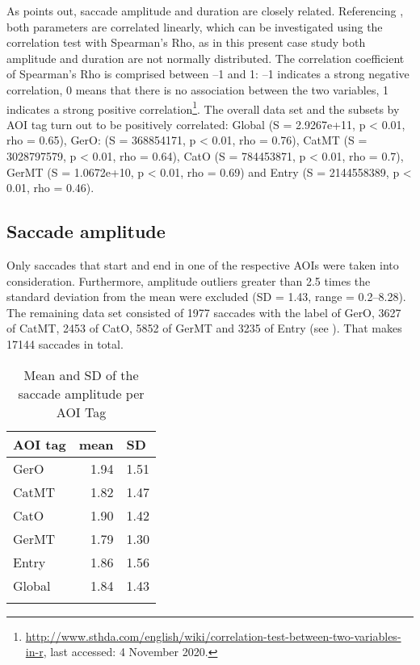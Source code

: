 \documentclass[output=paper,colorlinks,citecolor=brown]{langscibook}
\begin{document}
As \citet[321]{holmqvist_eye_2011} points out, saccade amplitude and duration are closely related. Referencing \citet{carpenter_movements_1988}, both parameters are correlated linearly, which can be investigated using the correlation test with Spearman's Rho, as in this present case study both amplitude and duration are not normally distributed. The correlation coefficient of Spearman's Rho is comprised between --1 and 1: --1 indicates a strong negative correlation, 0 means that there is no association between the two variables, 1 indicates a strong positive correlation\footnote{\url{http://www.sthda.com/english/wiki/correlation-test-between-two-variables-in-r}, last accessed: 4 November 2020.}. The overall data set and the subsets by AOI tag turn out to be positively correlated: Global (S = 2.9267e+11, p < 0.01, rho = 0.65), GerO: (S = 368854171, p < 0.01, rho = 0.76), CatMT (S = 3028797579, p < 0.01, rho = 0.64), CatO (S = 784453871, p < 0.01, rho = 0.7), GerMT (S = 1.0672e+10, p < 0.01, rho = 0.69) and Entry (S = 2144558389, p < 0.01, rho = 0.46).


\subsection{Saccade amplitude}
\label{subsec:results:sacamp}


Only saccades that start and end in one of the respective AOIs were taken into consideration. Furthermore, amplitude outliers greater than 2.5 times the standard deviation from the mean were excluded (SD = 1.43, range = 0.2--8.28). The remaining data set consisted of 1977 saccades with the label of GerO, 3627 of CatMT, 2453 of CatO, 5852 of GerMT and 3235 of Entry (see ). That makes 17144 saccades in total.

\begin{table}
\caption{Mean and SD of the saccade amplitude per AOI Tag}
\label{tab:sacamp}
 \begin{tabularx}{\textwidth}{XrY}
  \lsptoprule
             AOI tag & mean & SD \\
  \midrule
  GerO  & 1.94 & 1.51 \\
  CatMT  & 1.82 & 1.47\\
  CatO   & 1.90 & 1.42\\
  GerMT  & 1.79 & 1.30\\
  Entry  & 1.86 & 1.56\\
  Global & 1.84 & 1.43\\
  \lspbottomrule
 \end{tabularx}
\end{table}
\end{document}
